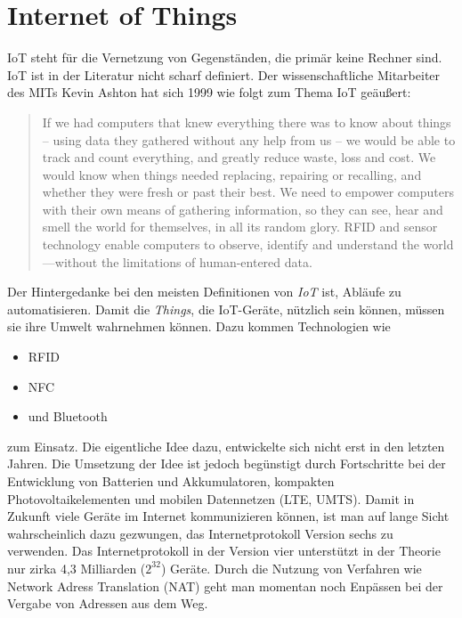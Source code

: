 \section{Internet of Things}
\ac{IoT} steht für die Vernetzung von Gegenständen, die primär keine Rechner sind. \ac{IoT} ist in der Literatur nicht scharf definiert. Der wissenschaftliche Mitarbeiter des MITs Kevin Ashton hat sich 1999 wie folgt zum Thema \ac{IoT} geäußert: 
\begin{quote}
If we had computers that knew everything there was to know about things -- using data they gathered 
without any help from us -- we would be able to track and count everything, and greatly reduce waste, 
loss and cost. We would know when things needed replacing, repairing or recalling, and whether they 
were fresh or past their best. We need to empower computers with their own means of gathering 
information, so they can see, hear and smell the world for themselves, in all its random glory. RFID and 
sensor technology enable computers to observe, identify and understand the world—without the 
limitations of human-entered data.
\end{quote}

Der Hintergedanke bei den meisten Definitionen von \textit{\ac{IoT}} ist, Abläufe zu automatisieren. Damit die \textit{Things}, die \ac{IoT}-Geräte, nützlich sein können, müssen sie ihre Umwelt wahrnehmen können. Dazu kommen Technologien wie 
\begin{itemize}
\item \ac{RFID}
\item \ac{NFC}
\item und Bluetooth
\end{itemize} 
zum Einsatz.
Die eigentliche Idee dazu, entwickelte sich nicht erst in den letzten Jahren. Die Umsetzung der Idee ist jedoch begünstigt durch Fortschritte bei der Entwicklung von Batterien und Akkumulatoren, kompakten Photovoltaikelementen und mobilen Datennetzen (LTE, UMTS). 
Damit in Zukunft viele Geräte im Internet kommunizieren können, ist man auf lange Sicht wahrscheinlich dazu gezwungen, das Internetprotokoll Version sechs zu verwenden. Das Internetprotokoll in der Version vier unterstützt in der Theorie nur zirka 4,3 Milliarden ($2^{32}$) Geräte. Durch die Nutzung von Verfahren wie Network Adress Translation (NAT) geht man momentan noch Enpässen bei der Vergabe von Adressen aus dem Weg. 

